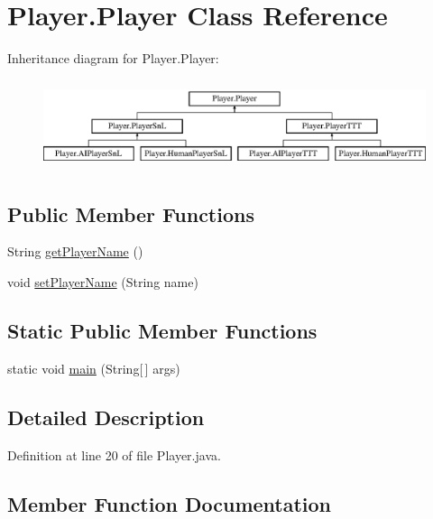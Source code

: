 \hypertarget{class_player_1_1_player}{}\section{Player.\+Player Class Reference}
\label{class_player_1_1_player}
Inheritance diagram for Player.\+Player\+:\begin{figure}[H]
\begin{center}
\leavevmode
\includegraphics[height=2.641510cm]{class_player_1_1_player}
\end{center}
\end{figure}
\subsection*{Public Member Functions}
\begin{DoxyCompactItemize}
\item 
String \hyperlink{class_player_1_1_player_ad8906c9e2ffb8388625575c6673e4b0b}{get\+Player\+Name} ()
\item 
void \hyperlink{class_player_1_1_player_ab3aeb1c66c6adb5c9a6581b5ab1707a2}{set\+Player\+Name} (String name)
\end{DoxyCompactItemize}
\subsection*{Static Public Member Functions}
\begin{DoxyCompactItemize}
\item 
static void \hyperlink{class_player_1_1_player_afb83f5bf48e6debe52a1e1bbe3e8fc51}{main} (String\mbox{[}$\,$\mbox{]} args)
\end{DoxyCompactItemize}


\subsection{Detailed Description}


Definition at line 20 of file Player.\+java.



\subsection{Member Function Documentation}
\hypertarget{class_player_1_1_player_ad8906c9e2ffb8388625575c6673e4b0b}{}
